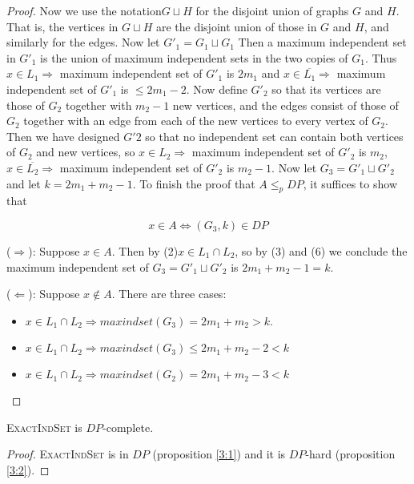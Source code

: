 \begin{proof}
    Now we use the notation$ G\sqcup H$ for the disjoint union of graphs $G$ and $H$. That is, the vertices in $G\sqcup H$ are the disjoint union of those in $G$ and $H$, and similarly for the edges. Now let $G'_1=G_1\sqcup G_1$ Then a maximum independent set in $G'_1$ is the union of maximum independent sets in the two copies of $G_1$. Thus $x\in L_1\Rightarrow$ maximum independent set of $G'_1$ is $2m_1$ and $x\in \overline{L_1} \Rightarrow$ maximum independent set of $G'_1$ is $\leqslant 2m_1-2$. Now define $G'_2$ so that its vertices are those of $G_2$ together with $m_2-1$ new vertices, and the edges consist of those of $G_2$ together with an edge from each of the new vertices to every vertex of $G_2$. Then we have designed $G'2$ so that no independent set can contain both vertices of $G_2$ and new vertices, so $x\in L_2 \Rightarrow$ maximum independent set of $G'_2$ is $m_2$, $x\in \overline{L_2} \Rightarrow$ maximum independent set of $G'_2$ is $m_2-1$. Now let $G_3=G'_1\sqcup G'_2$ and let $k= 2m_1+m_2-1$. To finish the proof that $A\leqslant_p DP$, it suffices to show that 
    
    \begin{lemma}
        $$x\in A\Leftrightarrow(G_3, k)\in DP$$
    \end{lemma}
    
    ($\Rightarrow$): Suppose $x\in A$. Then by (2)$x\in L_1 \cap L_2$, so by (3) and (6) we conclude the maximum independent set of $G_3=G'_1\sqcup  G'_2$ is $2m_1+m_2-1 =k$.
    
    ($\Leftarrow$): Suppose $x \not\in A$. There are three cases:
    \begin{itemize}
        \item $x\in L_1 \cap L_2\Rightarrow maxindset(G_3) = 2m_1+m_2> k$.
        \item $x\in L_1 \cap L_2\Rightarrow maxindset(G_3)\leqslant 2m_1+m_2-2< k$
        \item $x\in L_1 \cap L_2\Rightarrow maxindset(G_2) = 2m_1+m_2-3< k$
    \end{itemize}
\end{proof}

\begin{theoreme}
    \textsc{ExactIndSet} is $DP$-complete.
\end{theoreme}
\begin{proof}
    \textsc{ExactIndSet} is in $DP$ (proposition \ref{3:1}) and it is $DP$-hard (proposition \ref{3:2}).
\end{proof}

